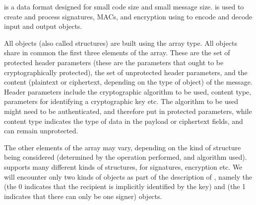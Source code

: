 {

\mCbor{} is a data format designed for small code size and small message size. \mCose{} is used to create and process signatures, MACs, and encryption using \mCbor{} to encode and decode input and output objects.

All \mCose{} objects (also called structures) are built using the \mCbor{} array type. All objects share in common the first three elements of the array. These are the set of protected header parameters (these are the parameters that ought to be cryptographically protected), the set of unprotected header parameters, and the content (plaintext or ciphertext, depending on the type of \mCose{} object) of the message. Header parameters include the cryptographic algorithm to be used, content type, parameters for identifying a cryptographic key etc. The algorithm to be used might need to be authenticated, and therefore put in protected parameters, while content type indicates the type of data in the payload or ciphertext fields, and can remain unprotected.

The other elements of the \mCbor{} array may vary, depending on the kind of \mCose{} structure being considered (determined by the operation performed, and algorithm used). \mCose{} supports many different kinds of structures, for signatures, encryption etc. We will encounter only two kinds of \mCose{} objects as part of the description of \mEdhoc, namely the \mCoseEncrypt{} (the 0 indicates that the recipient is implicitly identified by the key) and \mCoseSign{} (the 1 indicates that there can only be one signer) objects.

}
